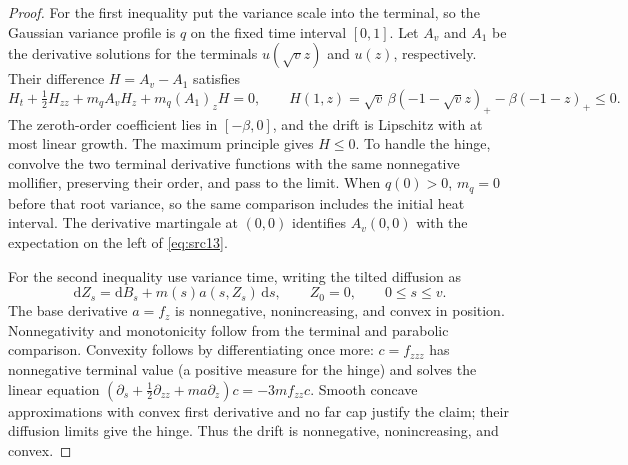 \documentclass[11pt,a4paper]{article}
\numberwithin{equation}{section}
\theoremstyle{definition}
\theoremstyle{remark}
\newcommand{\dd}{\mathrm d}
\begin{document}
\begin{proof}
For the first inequality put the variance scale into the terminal, so the
Gaussian variance profile is $q$ on the fixed time interval $[0,1]$.
Let $A_v$ and $A_1$ be the derivative solutions for the terminals
$u(\sqrt v z)$ and $u(z)$, respectively.  Their difference $H=A_v-A_1$
satisfies
\[
 H_t+\tfrac12H_{zz}+m_q A_vH_z+m_q(A_1)_zH=0,
 \qquad H(1,z)=\sqrt v\,\beta(-1-\sqrt v z)_+
                       -\beta(-1-z)_+\le0.
\]
The zeroth-order coefficient lies in $[-\beta,0]$, and the drift is
Lipschitz with at most linear growth.  The maximum principle gives
$H\le0$.  To handle the hinge, convolve the two terminal derivative
functions with the same nonnegative mollifier, preserving their order,
and pass to the limit.  When $q(0)>0$, $m_q=0$ before that root variance,
so the same comparison includes the initial heat interval.  The derivative
martingale at $(0,0)$ identifies $A_v(0,0)$ with the expectation on the
left of \eqref{eq:src13}.

For the second inequality use variance time, writing the tilted diffusion
as
\[
 \dd Z_s=\dd B_s+m(s)a(s,Z_s)\,\dd s,\qquad Z_0=0,
 \qquad 0\le s\le v.
\]
The base derivative $a=f_z$ is nonnegative, nonincreasing, and convex in
position.  Nonnegativity and monotonicity follow from the terminal and
parabolic comparison.  Convexity follows by differentiating once more:
$c=f_{zzz}$ has nonnegative terminal value (a positive measure for the
hinge) and solves the linear equation
$(\partial_s+\frac12\partial_{zz}+ma\partial_z)c=-3mf_{zz}c$.
Smooth concave approximations with convex first derivative and no far cap
justify the claim; their diffusion limits give the hinge.
Thus the drift is nonnegative, nonincreasing, and convex.


\end{proof}
\end{document}
